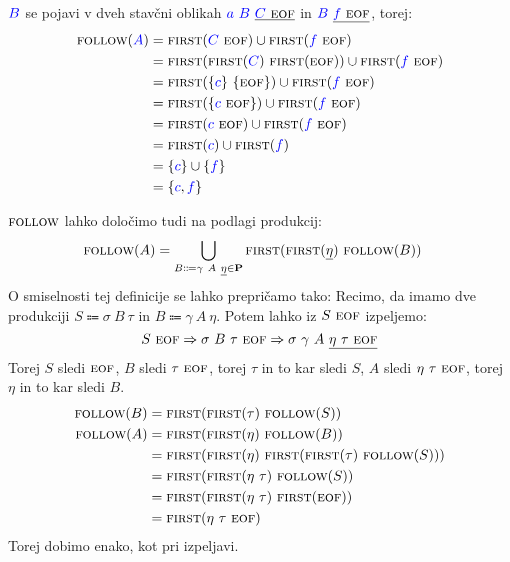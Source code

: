 \documentclass{article}
\newcommand{\FIRST}{\textsc{first}}
\newcommand{\FOLLOW}{\textsc{follow}}
\newcommand{\EOF}{\textsc{eof}}
\newcommand{\Set}[1]{\mathbf{#1}}
\newcommand{\Symbol}[1]{\textcolor{blue}{#1}}
\newcommand{\Productions}{\Set{P}}
\newcommand{\Arrow}{\Coloneq}
\newcommand{\Derive}{\Rightarrow}
\newcommand{\Seq}{\ }
\begin{document}
$\Symbol{B}$ se pojavi v dveh stavčni oblikah $\Symbol{a} \Seq \Symbol{B} \Seq \underline{\Symbol{C} \Seq \EOF}$ in $\Symbol{B} \Seq \underline{\Symbol{f} \Seq \EOF}$, torej:
\begin{align*}
  \FOLLOW(\Symbol{A}) &= \FIRST(\Symbol{C} \Seq \EOF) \cup \FIRST(\Symbol{f} \Seq \EOF)\\
             &= \FIRST(\FIRST(\Symbol{C}) \Seq \FIRST(\EOF)) \cup \FIRST(\Symbol{f} \Seq \EOF)\\
             &= \FIRST(\{\Symbol{c}\} \Seq \{\EOF\}) \cup \FIRST(\Symbol{f} \Seq \EOF)\\
             &= \FIRST(\{\Symbol{c} \Seq \EOF\}) \cup \FIRST(\Symbol{f} \Seq \EOF)\\
             &= \FIRST(\Symbol{c} \Seq \EOF) \cup \FIRST(\Symbol{f} \Seq \EOF)\\
             &= \FIRST(\Symbol{c}) \cup \FIRST(\Symbol{f})\\
             &= \{\Symbol{c}\} \cup \{\Symbol{f}\}\\
             &= \{\Symbol{c}, \Symbol{f}\}
\end{align*}

$\FOLLOW$ lahko določimo tudi na podlagi produkcij:
\begin{align*}
  \FOLLOW(A) &= \bigcup_{B \Arrow \gamma \Seq A \Seq \underline{\eta} \in \Productions} \FIRST(\FIRST(\underline{\eta}) \Seq \FOLLOW(B))
\end{align*}
O smiselnosti tej definicije se lahko prepričamo tako:
Recimo, da imamo dve produkciji $S \Arrow \sigma \Seq B \Seq \tau$ in $B \Arrow \gamma \Seq A \Seq \eta$.
Potem lahko iz $S \Seq \EOF$ izpeljemo:
\begin{equation*}
  S \Seq \EOF \Derive \sigma \Seq B \Seq \tau \Seq \EOF \Derive \sigma \Seq \gamma \Seq A \Seq \underline{\eta \Seq \tau \Seq \EOF}
\end{equation*}
Torej $S$ sledi $\EOF$, $B$ sledi $\tau \Seq \EOF$, torej $\tau$ in to kar sledi $S$, $A$ sledi $\eta \Seq \tau \Seq \EOF$, torej $\eta$ in to kar sledi $B$.
\begin{align*}
  \FOLLOW(B) &= \FIRST(\FIRST(\tau) \Seq \FOLLOW(S))\\
  \FOLLOW(A) &= \FIRST(\FIRST(\eta) \Seq \FOLLOW(B))\\
   &= \FIRST(\FIRST(\eta) \Seq \FIRST(\FIRST(\tau) \Seq \FOLLOW(S)))\\
   &= \FIRST(\FIRST(\eta \Seq \tau) \Seq \FOLLOW(S))\\
   &= \FIRST(\FIRST(\eta \Seq \tau) \Seq \FIRST(\EOF))\\
   &= \FIRST(\eta \Seq \tau \Seq \EOF)
\end{align*}
Torej dobimo enako, kot pri izpeljavi.
\end{document}

